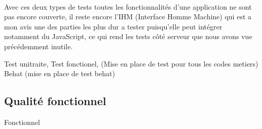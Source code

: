   \paragraph{}
 Avec ces deux types de tests toutes les fonctionnalités d'une application ne sont pas encore couverte, il reste encore l'IHM (Interface Homme Machine) qui est a mon avis une des parties les plus dur a tester puisqu'elle peut intégrer notamment du JavaScript, ce qui rend les tests côté serveur que nous avons vue précédemment inutile. 
 
Test unitraite, Test fonctionel, (Mise en place de test  pour tous les codes metiers) 
Behat (mise en place de test behat) 
\subsection{Qualité fonctionnel}
Fonctionnel
